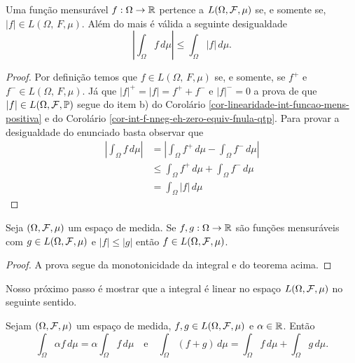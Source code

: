 \begin{teorema}
Uma função mensurável $f:\Omega\to\mathbb{R}$ 
pertence a $L(\Omega,\mathcal{F},\mu)$ se, e somente se,
$|f|\in L(\Omega,\,F,\mu)$.  Além do mais é válida
a seguinte desigualdade 
	\[
		\left|
		\int_{\Omega}f\, d\mu 
		\right|
		\leq
		\int_{\Omega}|f|\, d\mu.
	\]
\end{teorema}


\begin{proof}
Por definição temos que $f\in L(\Omega,\,F,\mu)$
se, e somente, se $f^{+}$ e $f^{-}\in L(\Omega,\,F,\mu)$.
Já que $|f|^{+}=|f|=f^{+}+f^{-}$ e $|f|^{-}=0$ a prova de 
que $|f|\in L(\Omega,\mathcal{F},\mathbb{P})$ segue do item b) do 
Corolário \ref{cor-linearidade-int-funcao-mens-positiva}
e do Corolário \ref{cor-int-f-nneg-eh-zero-equiv-fnula-qtp}.
Para provar a desigualdade do enunciado basta observar que 
	\begin{align*}
		\left|
		\int_{\Omega}f\, d\mu 
		\right|
		&=
		\left|
		\int_{\Omega}f^{+}\, d\mu - \int_{\Omega}f^{-}\, d\mu 
		\right|
		\\
		&\leq
		\int_{\Omega}f^{+}\, d\mu+\int_{\Omega}f^{-}\, d\mu
		\\
		&=
		\int_{\Omega}|f|\, d\mu 		
	\end{align*}
\end{proof}









\begin{corolario}\label{cor-g-integravel-e-|f|<=|g|-f-integravel}
Seja $(\Omega,\mathcal{F},\mu)$ um espaço de medida. 
Se $f,g:\Omega\to\mathbb{R}$ são funções mensuráveis 
com $g\in L(\Omega,\mathcal{F},\mu)$ e $|f|\leq |g|$
então $f\in L(\Omega,\mathcal{F},\mu)$.
\end{corolario}

\begin{proof}
A prova segue da monotonicidade da integral e do teorema acima.
\end{proof}


Nosso próximo passo é mostrar que a integral é linear 
no espaço $L(\Omega,\mathcal{F},\mu)$ no seguinte sentido.



\begin{teorema}\label{teo-linearidadde-integral-func-real}
Sejam $(\Omega,\mathcal{F},\mu)$ um espaço de medida,
$f,g\in L(\Omega,\mathcal{F},\mu)$ e $\alpha\in\mathbb{R}$. 
Então
\[
	\int_{\Omega}\alpha f\, d\mu 
	= 
	\alpha\int_{\Omega} f\, d\mu
	\quad
	\text{e}
	\quad
	\int_{\Omega} (f+g)\, d\mu 
	= 
	\int_{\Omega} f\, d\mu +\int_{\Omega} g\, d\mu.
\]
\end{teorema}


